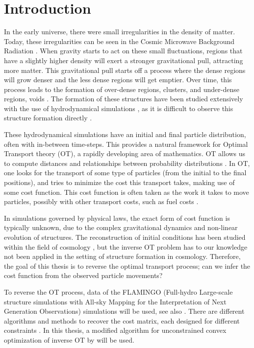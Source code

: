 \chapter{Introduction}
In the early universe, there were small irregularities in the density of matter. Today, these irregularities can be seen in the Cosmic Microwave Background Radiation \citep{durrer2015}. When gravity starts to act on these small fluctuations, regions that have a slightly higher density will exert a stronger gravitational pull, attracting more matter. This gravitational pull starts off a process where the dense regions will grow denser and the less dense regions will get emptier. Over time, this process leads to the formation of over-dense regions, clusters, and under-dense regions, voids \citep{zeldovich1970}. The formation of these structures have been studied extensively with the use of hydrodynamical simulations \citep{schaye2014, crain2015, schaye2023, kugel2023}, as it is difficult to observe this structure formation directly \citep{bos2016}. \par 
These hydrodynamical simulations have an initial and final particle distribution, often with in-between time-steps. This provides a natural framework for Optimal Transport theory (OT), a rapidly developing area of mathematics. OT allows us to compute distances and relationships between probability distributions \citep{villani2003}. In OT, one looks for the transport of some type of particles (from the initial to the final positions), and tries to minimize the cost this transport takes, making use of some cost function. This cost function is often taken as the work it takes to move particles, possibly with other transport costs, such as fuel costs \citep{villani2008}. \par 
In simulations governed by physical laws, the exact form of cost function is typically unknown, due to the complex gravitational dynamics and non-linear evolution of structures. The reconstruction of initial conditions has been studied within the field of cosmology \citep{nikakhtar2024}, but the inverse OT problem has to our knowledge not been applied in the setting of structure formation in cosmology. Therefore, the goal of this thesis is to reverse the optimal transport process; can we infer the cost function from the observed particle movements?  \par 
To reverse the OT process, data of the FLAMINGO (Full-hydro Large-scale structure simulations with All-sky Mapping for the Interpretation of Next Generation Observations) simulations will be used, see also \citet{schaye2023, kugel2023}. There are different algorithms and methods to recover the cost matrix, each designed for different constraints \citep{stuart2020, ma2021, li2019, chiu2022}. In this thesis, a modified algorithm for unconstrained convex optimization of inverse OT by \citet{ma2021} will be used. \par 
